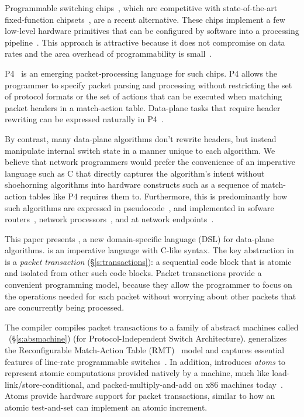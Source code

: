 Programmable switching chips~\cite{flexpipe, xpliant, rmt}, which are
competitive with state-of-the-art fixed-function chipsets~\cite{trident,
tomahawk, mellanox}, are a recent alternative.  These chips implement a few
low-level hardware primitives that can be configured by software into a
processing pipeline~\cite{xpliant_sdk,xpliant_sdk2,intel_sdk}. This approach is
attractive because it does not compromise on data rates and the area overhead
of programmability is small~\cite{rmt}.

P4~\cite{p4, p4spec} is an emerging packet-processing language for
such chips. P4 allows the programmer to specify packet parsing and
processing without restricting the set of protocol formats or the set
of actions that can be executed when matching packet headers in a
match-action table. Data-plane tasks that require header rewriting can
be expressed naturally in P4~\cite{dc_p4}.

By contrast, many data-plane algorithms don't rewrite headers, but instead
manipulate internal switch state in a manner unique to each algorithm. We
believe that network programmers would prefer the convenience of an imperative
language such as C that directly captures the algorithm's intent without
shoehorning algorithms into hardware constructs such as a sequence of
match-action tables like P4 requires them to.  Furthermore, this is
predominantly how such algorithms are expressed in pseudocode~\cite{red, csfq,
codel_code, avq, blue}, and implemented in sofware routers~\cite{click, dpdk,
routebricks}, network processors~\cite{packetc, nova}, and at network
endpoints~\cite{qdisc}.

This paper presents \pktlanguage, a new domain-specific language (DSL) for
data-plane algorithms.  \pktlanguage is an imperative language with C-like
syntax. The key abstraction in \pktlanguage is a {\em packet transaction}
(\S\ref{s:transactions}): a sequential code block that is atomic and isolated
from other such code blocks. Packet transactions provide a convenient
programming model, because they allow the programmer to focus on the operations
needed for each packet without worrying about other packets that are
concurrently being processed.

The \pktlanguage compiler compiles packet transactions to a family of abstract
machines called \absmachine~(\S\ref{s:absmachine}) (for Protocol-Independent
Switch Architecture). \absmachine generalizes the Reconfigurable Match-Action
Table (RMT)~\cite{rmt} model and captures essential features of line-rate
programmable switches~\cite{rmt, xpliant, flexpipe}. In addition, \absmachine
introduces {\em atoms} to represent atomic computations provided natively by a
\absmachine machine, much like load-link/store-conditional, and
packed-multiply-and-add on x86 machines today~\cite{x86_manual}.  Atoms provide
hardware support for packet transactions, similar to how an atomic test-and-set
can implement an atomic increment.

